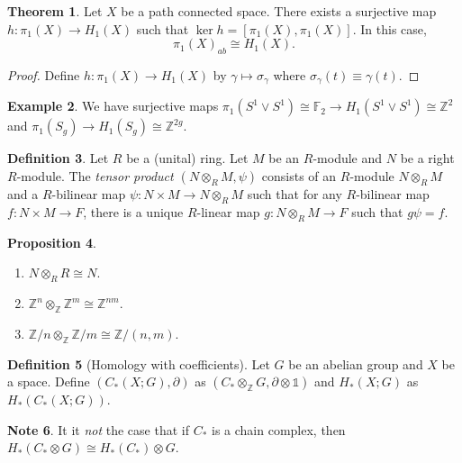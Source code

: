 \documentclass[10pt,letterpaper,cm]{nupset}
\theoremstyle{definition}
\newtheorem{definition}{Definition}[subsection]
\newtheorem{exmp}[definition]{Example}
\newtheorem{note}[definition]{Note}
\theoremstyle{theorem}
\newtheorem{theorem}[definition]{Theorem}
\newtheorem{prop}[definition]{Proposition}
\theoremstyle{remark}
\newcommand{\F}{\mathbb F}
\newcommand{\Z}{\mathbb Z}
\newcommand{\1}{\mathbb{1}}
\newcommand{\0}{\vec 0}
\begin{document}
\begin{theorem}
Let $X$ be a path connected space. There exists a surjective map $h: \pi_1(X) \to H_1(X)$ such that $\ker{h} = \left[\pi_1(X), \pi_1(X)\right]$. In this case, $$\pi_1(X)_{ab} \cong H_1(X).$$
\end{theorem}
\begin{proof}
Define $h: \pi_1(X) \to H_1(X)$ by $\gamma \mapsto \sigma_{\gamma}$ where $\sigma_{\gamma}(t) \equiv \gamma(t)$.  
\end{proof}

\begin{exmp}
We have surjective maps $\pi_1(S^1 \vee S^1) \cong \F_2 \to H_1(S^1 \vee S^1) \cong \Z^2$ and $\pi_1(S_g) \to H_1(S_g) \cong \Z^{2g}$.
\end{exmp}

\medskip


\begin{definition}
Let $R$ be a (unital) ring. Let $M$ be an $R$-module and $N$ be a right $R$-module. The \textit{tensor product $\left(N \otimes_R M, \psi\right)$} consists of an $R$-module $N \otimes_R M$ and a $R$-bilinear map $\psi : N \times M \to N \otimes_R M$ such that for any $R$-bilinear map $f: N \times M \to F$, there is a unique $R$-linear map $g : N \otimes_R M \to F$ such that $g{\psi} = f$.
\end{definition}

\begin{prop} $ $
\begin{enumerate}
\item $N \otimes_R R \cong N$.
\item $\Z^n \otimes_{\Z} \Z^m \cong \Z^{nm}$.
\item $\Z/n \otimes_{\Z} \Z/m \cong \Z/ (n,m)$.
\end{enumerate}
\end{prop}

\begin{definition}[Homology with coefficients]
Let $G$ be an abelian group and $X$ be a space.  Define $(C_{\ast}(X; G), \partial)$ as $(C_{\ast} \otimes_{\Z} G, \partial \otimes \1) $ and $H_{\ast}(X;G)$ as $H_{\ast}(C_{\ast}(X;G))$.
\end{definition}

\begin{note}
It it \textit{not} the case that if $C_{\ast}$ is a chain complex, then $H_{\ast}(C_{\ast} \otimes G) \cong H_{\ast}(C_{\ast}) \otimes G$.
\end{note}
\end{document}
